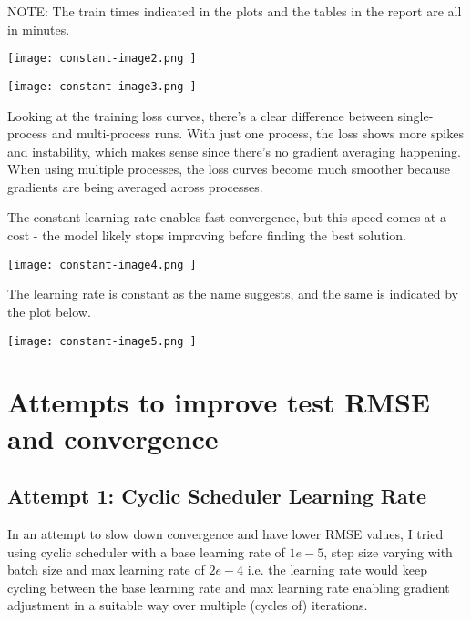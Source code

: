 \documentclass{article}
\begin{document}
NOTE: The train times indicated in the plots and the tables in the report are all in minutes.

\begin{center}
\texttt{[image: constant-image2.png ]}
\end{center}

\begin{center}
\texttt{[image: constant-image3.png ]}
\end{center}

Looking at the training loss curves, there's a clear difference between single-process and multi-process runs. With just one process, the loss shows more spikes and instability, which makes sense since there's no gradient averaging happening. When using multiple processes, the loss curves become much smoother because gradients are being averaged across processes.

The constant learning rate enables fast convergence, but this speed comes at a cost - the model likely stops improving before finding the best solution.

\begin{center}
\texttt{[image: constant-image4.png ]}
\end{center}

The learning rate is constant as the name suggests, and the same is indicated by the plot below.

\begin{center}
\texttt{[image: constant-image5.png ]}
\end{center}

\section{Attempts to improve test RMSE and convergence}

\subsection {Attempt 1: Cyclic Scheduler Learning Rate }
In an attempt to slow down convergence and have lower RMSE values, I tried using cyclic scheduler with a base learning rate of $1e-5$, step size varying with batch size and max learning rate of $2e-4$ i.e. the learning rate would keep cycling between the base learning rate and max learning rate enabling gradient adjustment in a suitable way over multiple (cycles of) iterations.
\end{document}
